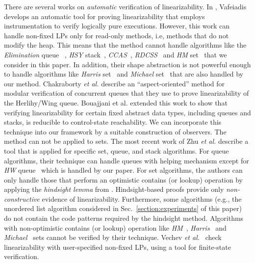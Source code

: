 There are several works on {\it automatic} verification of linearizability.
%
In \cite{Vafeiadis:cav10}, Vafeiadis
develops an automatic tool for proving  linearizability that
employs instrumentation to verify logically pure executions.
%
However, this work can handle non-fixed LPs only for read-only methods,
i.e, methods that do not modify the heap.
%
This means that the method cannot handle
 algorithms like the {\it Elimination} queue ~\cite{Shavit:ElimQueue}, {\it HSY} stack~\cite{HSYstack}, {\it CCAS}~\cite{Harris:CAS}, 
{\it RDCSS}~\cite{Harris:CAS} and {\it HM} set~\cite{ArtOfMpP} that we consider in this paper. In addition, their shape abstraction is not powerful enough to handle algorithms like {\it Harris} set~\cite{Harris:list} and {\it Michael} set~\cite{Michael:list} that are also handled by our method.
%
%
Chakraborty {\it et al.} \cite{HSV:concur13}
describe an ``aspect-oriented'' method for  modular verification 
of concurrent queues that they use to prove linearizability of the Herlihy/Wing queue.
Bouajjani et al. \cite{BEEH:icalp15} extended this work to show that verifying 
linearizability for certain
fixed abstract data types, including queues and stacks, is reducible to 
control-state reachability. 
%
We can incorporate this technique into
our framework by a suitable construction of observers.
The method can not be applied to sets.
%
The most recent work of Zhu {\it et al.} \cite{Poling}
describe a tool that is applied for specific set, queue, and stack  
algorithms. For queue algorithms, their technique can handle queues with helping mechanism except for {\it HW} queue~\cite{HeWi:linearizability} which is handled by our paper.
%
For set algorithms, the authors can only handle those that perform an optimistic contains (or lookup) operation by applying the {\it hindsight lemma} from 
\cite{OHearnlist}. 
%
Hindsight-based proofs provide only {\it non-constructive} 
evidence of linearizability.
%
Furthermore, some algorithms (e.g., the unordered list algorithm
considered in Sec.~\ref{section:experiments} of this paper)
do not contain the code patterns required by the hindsight method. Algorithms with non-optimistic contains (or lookup) operation like {\it HM}~\cite{ArtOfMpP}, {\it Harris}~\cite{Harris:list} and {\it Michael}~\cite{Michael:list} sets cannot be verified by their technique.  
%
Vechev {\it et al.}~\cite{Vechev:spin09}
check linearizability with user-specified non-fixed LPs,
using a tool for finite-state verification.
